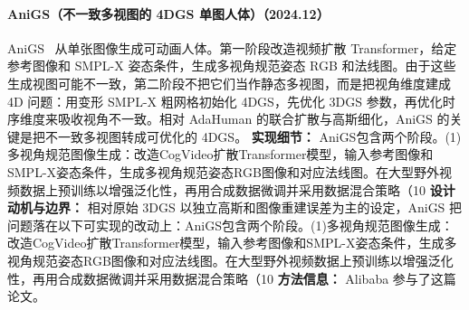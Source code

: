 \paragraph{AniGS（不一致多视图的 4DGS 单图人体）（2024.12）}
AniGS~\cite{2412_02684} 从单张图像生成可动画人体。第一阶段改造视频扩散 Transformer，给定参考图像和 SMPL-X 姿态条件，生成多视角规范姿态 RGB 和法线图。由于这些生成视图可能不一致，第二阶段不把它们当作静态多视图，而是把视角维度建成 4D 问题：用变形 SMPL-X 粗网格初始化 4DGS，先优化 3DGS 参数，再优化时序维度来吸收视角不一致。相对 AdaHuman 的联合扩散与高斯细化，AniGS 的关键是把不一致多视图转成可优化的 4DGS。
\textbf{实现细节：} AniGS包含两个阶段。(1)多视角规范图像生成：改造CogVideo扩散Transformer模型，输入参考图像和SMPL-X姿态条件，生成多视角规范姿态RGB图像和对应法线图。在大型野外视频数据上预训练以增强泛化性，再用合成数据微调并采用数据混合策略（10
\textbf{设计动机与边界：} 相对原始 3DGS 以独立高斯和图像重建误差为主的设定，AniGS 把问题落在以下可实现的改动上：AniGS包含两个阶段。(1)多视角规范图像生成：改造CogVideo扩散Transformer模型，输入参考图像和SMPL-X姿态条件，生成多视角规范姿态RGB图像和对应法线图。在大型野外视频数据上预训练以增强泛化性，再用合成数据微调并采用数据混合策略（10%
\textbf{方法信息：} Alibaba 参与了这篇论文。



